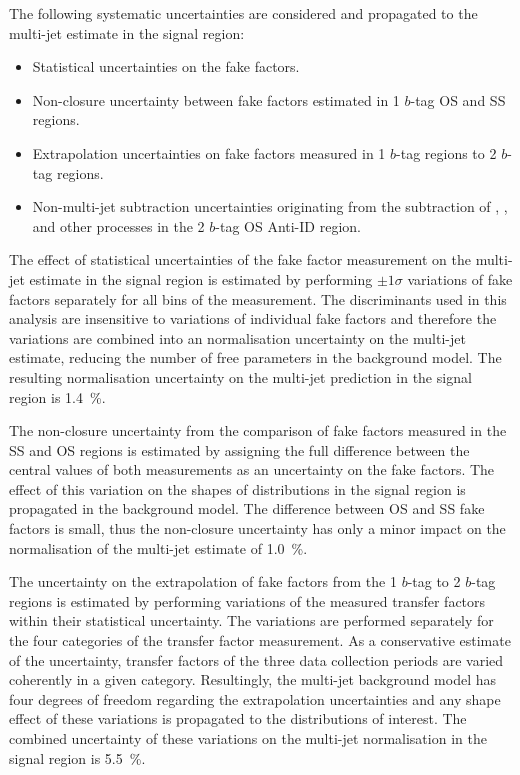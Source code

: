 The following systematic uncertainties are considered and propagated
to the multi-jet estimate in the \hadhad signal region:
\begin{itemize}

\item Statistical uncertainties on the fake factors.

\item Non-closure uncertainty between fake factors estimated in 1
  $b$-tag OS and SS regions.

\item Extrapolation uncertainties on fake factors measured in 1
  $b$-tag regions to 2 $b$-tag regions.

\item Non-multi-jet subtraction uncertainties originating from the
  subtraction of \ttbar, \ttbarFakes, and other processes in the 2
  $b$-tag OS Anti-ID region.

\end{itemize}

The effect of statistical uncertainties of the fake factor measurement
on the multi-jet estimate in the signal region is estimated by
performing $\pm 1 \sigma$ variations of fake factors separately for
all bins of the measurement. The discriminants used in this analysis
are insensitive to variations of individual fake factors and therefore
the variations are combined into an normalisation uncertainty on the
multi-jet estimate, reducing the number of free parameters in the
background model. The resulting normalisation uncertainty on the
multi-jet prediction in the signal region is \SI{1.4}{\percent}.

The non-closure uncertainty from the comparison of fake factors
measured in the SS and OS regions is estimated by assigning the full
difference between the central values of both measurements as an
uncertainty on the fake factors. The effect of this variation on the
shapes of distributions in the signal region is propagated in the
background model. The difference between OS and SS fake factors is
small, thus the non-closure uncertainty has only a minor impact on the
normalisation of the multi-jet estimate of \SI{1.0}{\percent}.

The uncertainty on the extrapolation of fake factors from the 1
$b$-tag to 2 $b$-tag regions is estimated by performing variations of
the measured transfer factors within their statistical
uncertainty. The variations are performed separately for the four
categories of the transfer factor measurement. As a conservative
estimate of the uncertainty, transfer factors of the three data
collection periods are varied coherently in a given
category. Resultingly, the multi-jet background model has four degrees
of freedom regarding the extrapolation uncertainties and any shape
effect of these variations is propagated to the distributions of
interest. The combined uncertainty of these variations on the
multi-jet normalisation in the signal region is \SI{5.5}{\percent}.

